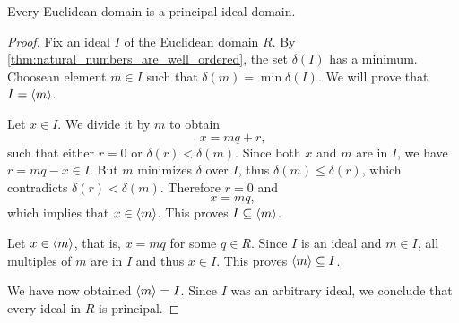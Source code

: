\begin{proposition}\label{thm:euclidean_domain_is_pid}
  Every Euclidean domain is a principal ideal domain.
\end{proposition}
\begin{proof}
  Fix an ideal \( I \) of the Euclidean domain \( R \). By \cref{thm:natural_numbers_are_well_ordered}, the set \( \delta(I) \) has a minimum. Choose\AOC an element \( m \in I \) such that \( \delta(m) = \min \delta(I) \). We will prove that \( I = \left\langle m \right\rangle \).

  Let \( x \in I \). We divide it by \( m \) to obtain
  \begin{equation*}
    x = mq + r,
  \end{equation*}
  such that either \( r = 0 \) or \( \delta(r) < \delta(m) \). Since both \( x \) and \( m \) are in \( I \), we have \( r = mq - x \in I \). But \( m \) minimizes \( \delta \) over \( I \), thus \( \delta(m) \leq \delta(r) \), which contradicts \( \delta(r) < \delta(m) \). Therefore \( r = 0 \) and
  \begin{equation*}
    x = mq,
  \end{equation*}
  which implies that \( x \in \left\langle m \right\rangle \). This proves \( I \subseteq \left\langle m \right\rangle \).

  Let \( x \in \left\langle m \right\rangle \), that is, \( x = mq \) for some \( q \in R \). Since \( I \) is an ideal and \( m \in I \), all multiples of \( m \) are in \( I \) and thus \( x \in I \). This proves \( \left\langle m \right\rangle \subseteq I \).

  We have now obtained \( \left\langle m \right\rangle = I \). Since \( I \) was an arbitrary ideal, we conclude that every ideal in \( R \) is principal.
\end{proof}

